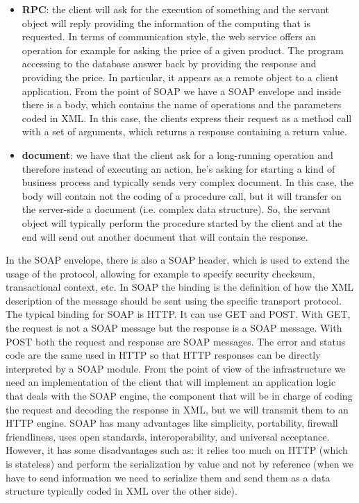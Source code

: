 \begin{itemize}
    \item \textbf{RPC}: the client will ask for the execution of something and the servant object will reply providing the information of the computing that is requested. In terms of communication style, the web service offers an operation for example for asking the price of a given product. The program accessing to the database answer back by providing the response and providing the price. In particular, it appears as a remote object to a client application. From the point of SOAP we have a SOAP envelope and inside there is a body, which contains the name of operations and the parameters coded in XML. In this case, the clients express their request as a method call with a set of arguments, which returns a response containing a return value.
    \item \textbf{document}: we have that the client ask for a long-running operation and therefore instead of executing an action, he's asking for starting a kind of business process and typically sends very complex document. In this case, the body will contain not the coding of a procedure call, but it will transfer on the server-side a document (i.e. complex data structure). So, the servant object will typically perform the procedure started by the client and at the end will send out another document that will contain the response.
\end{itemize}
In the SOAP envelope, there is also a SOAP header, which is used to extend the usage of the protocol, allowing for example to specify security checksum, transactional context, etc.
In SOAP the binding is the definition of how the XML description of the message should be sent using the specific transport protocol. The typical binding for SOAP is HTTP.
It can use GET and POST.
With GET, the request is not a SOAP message but the response is a SOAP message.
With POST both the request and response are SOAP messages.
The error and status code are the same used in HTTP so that HTTP responses can be directly interpreted by a SOAP module.
From the point of view of the infrastructure we need an implementation of the client that will implement an application logic that deals with the SOAP engine, the component that will be in charge of coding the request and decoding the response in XML, but we will transmit them to an HTTP engine.
SOAP has many advantages like simplicity, portability, firewall friendliness, uses open standards, interoperability, and universal acceptance.
However, it has some disadvantages such as: it relies too much on HTTP (which is stateless) and perform the serialization by value and not by reference (when we have to send information we need to serialize them and send them as a data structure typically coded in XML over  the other side).
